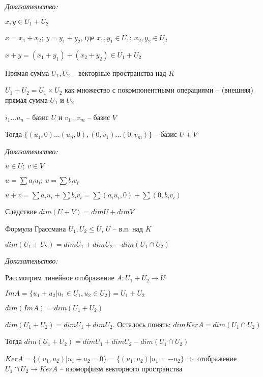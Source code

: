 \documentclass[12pt]{article}
\begin{document}
\textit{Доказательство:}

$x, y \in U_1 + U_2$

$x = x_1 + x_2;\ y = y_1 + y_2$, где $x_1, y_1 \in U_1;\ x_2, y_2 \in U_2$

$x + y = (x_1 + y_1) + (x_2 + y_2) \in U_1 + U_2$

\begin{defin}{Прямая сумма}
    $U_1, U_2$ -- векторные пространства над $K$

    $U_1 + U_2 = U_1 \times U_2$ как множество с покомпонентными операциями -- (внешняя) прямая сумма $U_1$ и $U_2$
\end{defin}

\begin{lem}{}
    $i_1 \ldots u_n$ -- базис $U$ и $v_1 \ldots v_m$ -- базис $V$

    Тогда $\{ (u_1, 0) \ldots (u_n, 0), (0, v_1) \ldots (0, v_m) \}$ -- базис $U + V$
\end{lem}

\textit{Доказательство:}

$u \in U;\ v \in V$

$u = \sum a_iu_i;\ v = \sum b_iv_i$

$u + v = \sum a_iu_i + \sum b_iv_i = \sum (a_iu_i, 0) + \sum (0, b_iv_i)$

\begin{theo}{Следствие}
    $dim(U + V) = dimU + dimV$
\end{theo}

\begin{theo}{Формула Грассмана}
    $U_1, U_2 \leq U$, $U$ -- в.п. над $K$

    $dim(U_1 + U_2) = dimU_1 + dimU_2 - dim(U_1 \cap U_2)$
\end{theo}

\textit{Доказательство:}

Рассмотрим линейное отображение $A : U_1 + U_2 \rightarrow U$

$ImA = \{ u_1 + u_2 | u_1 \in U_1, u_2 \in U_2 \} = U_1 + U_2$

$dim(ImA) = dim(U_1 + U_2)$

$dim(U_1 + U_2) = dimU_1 + dimU_2$. Осталось понять: $dimKerA = dim(U_1 \cap U_2)$

Тогда $dim(U_1 + U_2) = dimU_1 + dimU_2 - dim(U_1 \cap U_2)$

$KerA = \{ (u_1, u_2) | u_1 + u_2 = 0 \} = \{ (u_1, u_2) | u_1 = -u_2 \} \Rightarrow$ отображение $U_1 \cap U_2 \rightarrow KerA$ -- изоморфизм векторного пространства
\end{document}
